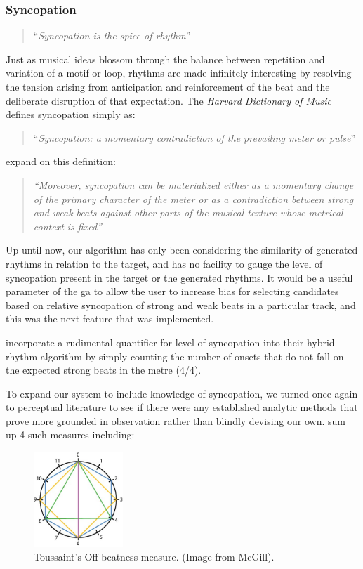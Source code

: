 {{{\subsubsection{Syncopation}

\blockcquote[]{Toussaint2013}{``\textit{Syncopation is the spice of rhythm}''}

Just as musical ideas blossom through the balance between repetition and variation of a motif or loop, rhythms are made infinitely interesting by resolving the tension arising from anticipation and reinforcement of the beat and the deliberate disruption of that expectation. The \textit{Harvard Dictionary of Music} defines syncopation simply as:

\blockcquote[]{Apel1969}{``\textit{Syncopation: a momentary contradiction of the prevailing meter or pulse}''}

\cite{Gomez2005} expand on this definition:

\blockquote{\textit{``Moreover, syncopation can be materialized either as a momentary change of the primary character of the meter or as a contradiction between strong and weak beats against other parts of the musical texture whose metrical context is fixed''}}

Up until now, our algorithm has only been considering the similarity of generated rhythms in relation to the target, and has no facility to gauge the level of syncopation present in the target or the generated rhythms. It would be a useful parameter of the \acrshort{ga} to allow the user to increase bias for selecting candidates based on relative syncopation of strong and weak beats in a particular track, and this was the next feature that was implemented.

\cite{Eigenfeldt2013} incorporate a rudimental quantifier for level of syncopation into their hybrid rhythm algorithm by simply counting the number of onsets that do not fall on the expected strong beats in the metre (4/4).

To expand our system to include knowledge of syncopation, we turned once again to perceptual literature to see if there were any established analytic methods that prove more grounded in observation rather than blindly devising our own. \cite{Gomez2005} sum up 4 such measures including:

  \begin{figure}
	\begin{center}
		\includegraphics[width=0.3\textwidth]{ch03_symbolic/figures/offBeatness.jpg}
	\end{center}
	\caption[Toussaint's Off-beatness measure]{Toussaint's Off-beatness measure. (Image from McGill).}
	\label{fig:offbeatness}
	\end{figure}
	
}}}

